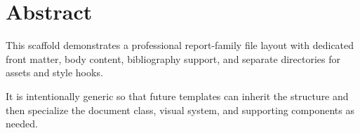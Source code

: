 \chapter*{Abstract}

This scaffold demonstrates a professional report-family file layout with dedicated front matter, body content, bibliography support, and separate directories for assets and style hooks.

It is intentionally generic so that future templates can inherit the structure and then specialize the document class, visual system, and supporting components as needed.

\clearpage
